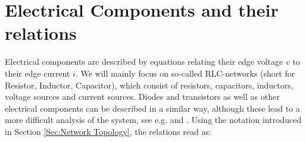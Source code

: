 \section{Electrical Components and their relations}
\label{Sec:Electrical Components and their relations}
Electrical components are described by equations relating their edge voltage $v$ to their edge current $i$. We will mainly focus on so-called RLC-networks (short for Resistor, Inductor, Capacitor), which consist of resistors, capacitors, inductors, voltage sources and current sources. Diodes and transistors as well as other electrical components can be described in a similar way, although these lead to a more difficult analysis of the system, see e.g. \cite{ModellingAndDiscretizationOfCircuitProblems} and \cite{SchwarzTischendorfCircuitMNA}. Using the notation introduced in Section \ref{Sec:Network Topology}, the relations read as:
